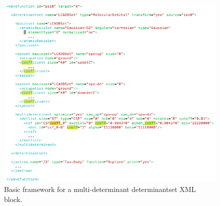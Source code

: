 \begin{figure}[ht!]
\begin{center}
\includegraphics[trim = 0mm 0mm 0mm 0mm, clip,width=1.0\columnwidth]{./figures/lab_advanced_molecules_xml_multideterminant}
\end{center}
\caption{Basic framework for a multi-determinant determinantset XML block.
\label{fig:lam_xml_multideterminant}
}
\end{figure}

